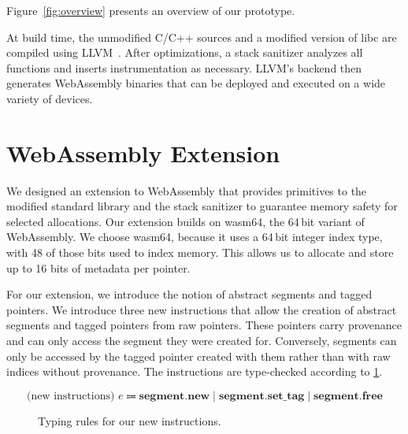 Figure~\ref{fig:overview} presents an overview of our prototype.

At build time, the unmodified C/C++ sources and a modified version of libc are compiled using LLVM~\cite{lattner2004llvm}.
After optimizations, a stack sanitizer analyzes all functions and inserts instrumentation as necessary.
LLVM's backend then generates WebAssembly binaries that can be deployed and executed on a wide variety of devices.

\section{WebAssembly Extension}
\label{sec:wasm-extension}

We designed an extension to WebAssembly that provides primitives to the modified standard library and the stack sanitizer to guarantee memory safety for selected allocations.
Our extension builds on wasm64, the 64\,bit variant of WebAssembly.
We choose wasm64, because it uses a 64\,bit integer index type, with 48 of those bits used to index memory.
This allows us to allocate and store up to 16 bits of metadata per pointer.

For our extension, we introduce the notion of abstract segments and tagged pointers.
We introduce three new instructions that allow the creation of abstract segments and tagged pointers from raw pointers.
These pointers carry provenance and can only access the segment they were created for.
Conversely, segments can only be accessed by the tagged pointer created with them rather than with raw indices without provenance.
The instructions are type-checked according to \cref{fig:typing-rules}.

\begin{equation*}
    \text{(new instructions) } e \Coloneqq \textbf{segment.new} \mid \textbf{segment.set\_tag} \mid \textbf{segment.free}
\end{equation*}


\begin{figure}[t]
    \begin{prooftree}
    \end{prooftree}
    \begin{prooftree}
    \end{prooftree}
    \begin{prooftree}
    \end{prooftree}
    \caption{Typing rules for our new instructions. }
    \label{fig:typing-rules}
\end{figure}

